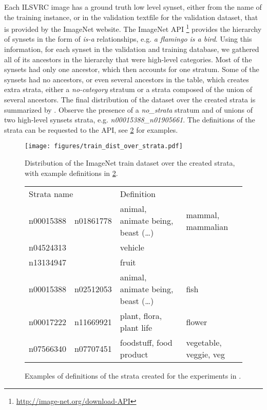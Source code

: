 \documentclass[12pt]{article}
\begin{document}
Each ILSVRC image has a ground truth low level
synset, either from the name of the training instance, or in the validation 
textfile for the validation dataset, that is provided by the ImageNet website.
The ImageNet API \footnote{\url{http://image-net.org/download-API}}
provides the hierarchy of synsets in the form of \emph{is-a} relationships, e.g.
\emph{a flamingo is a bird}. Using this information, for each synset in the 
validation and training database, we gathered all of its ancestors in the hierarchy
that were high-level categories.
Most of the synsets had only one ancestor, which then accounts for one stratum.
Some of the synsets had no ancestors, or even several ancestors in the table,
which creates extra strata, either a \emph{no-category} stratum or a
strata composed of the union of several ancestors. 
The final distribution of the dataset over the created strata is summarized by
.  Observe the presence of a \emph{no\_strata}
stratum and of unions of two high-level synsets strata, e.g.
\emph{n00015388\_n01905661}.
The definitions of the strata can be requested to the API, 
see \cref{strata_definitions_imagenet} for examples.

\begin{figure}[h]
\centering
\texttt{[image: figures/train\_dist\_over\_strata.pdf]}
\caption{Distribution of the ImageNet train dataset over the created strata,
with example definitions in \cref{strata_definitions_imagenet}.}
\label{fig:dist_strata_imagenet}
\end{figure}

\begin{figure}
    \centering
\begin{tabular}[h]{llll}
    \toprule
    \multicolumn{2}{l}{Strata name} & \multicolumn{2}{l}{Definition}\\
	 \cmidrule(lr){1-2}
	 \cmidrule(lr){3-4}
n00015388 & n01861778 & animal, animate being, beast (\dots)& mammal, mammalian \\
\multicolumn{2}{l}{n04524313} & \multicolumn{2}{l}{vehicle} \\
n13134947 & & fruit & \\
n00015388 & n02512053 & animal, animate being, beast (\dots) & fish \\
n00017222 & n11669921 & plant, flora, plant life & flower \\
n07566340 & n07707451 & foodstuff, food product & vegetable, veggie, veg \\
    \bottomrule
\end{tabular}
\caption{Examples of definitions of the strata created for the experiments in
.}\label{strata_definitions_imagenet}
\end{figure}
 
\end{document}
